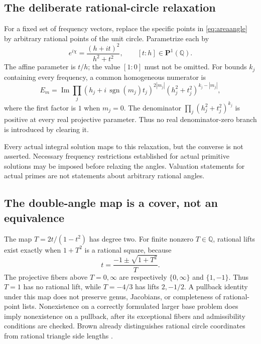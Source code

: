 \documentclass[11pt]{article}
\theoremstyle{definition}\newtheorem{definition}[theorem]{Definition}
\theoremstyle{remark}\newtheorem{remark}[theorem]{Remark}
\newcommand{\Q}{\mathbb Q}\newcommand{\Z}{\mathbb Z}\newcommand{\R}{\mathbb R}
\newcommand{\Pone}{\mathbf P^1}
\newcommand{\im}{\operatorname{Im}}\newcommand{\Jac}{\operatorname{Jac}}
\begin{document}
\subsection{The deliberate rational-circle relaxation}
For a fixed set of frequency vectors, replace the specific points in \eqref{eq:areaangle} by arbitrary rational points of the unit circle. Parametrize each by
\[
e^{i\chi}=\frac{(h+it)^2}{h^2+t^2},\qquad [t:h]\in\Pone(\Q).
\]
The affine parameter is $t/h$; the value $[1:0]$ must not be omitted. For bounds $k_j$ containing every frequency, a common homogeneous numerator is
\begin{equation}\label{eq:homogeneous}
E_m=\im\prod_j
(h_j+i\,\operatorname{sgn}(m_j)t_j)^{2|m_j|}
(h_j^2+t_j^2)^{k_j-|m_j|},
\end{equation}
where the first factor is $1$ when $m_j=0$. The denominator
$\prod_j(h_j^2+t_j^2)^{k_j}$ is positive at every real projective parameter. Thus no real denominator-zero branch is introduced by clearing it.

Every actual integral solution maps to this relaxation, but the converse is not asserted. Necessary frequency restrictions established for actual primitive solutions may be imposed before relaxing the angles. Valuation statements for actual primes are not statements about arbitrary rational angles.

\subsection{The double-angle map is a cover, not an equivalence}
The map $T=2t/(1-t^2)$ has degree two. For finite nonzero $T\in\Q$, rational lifts exist exactly when $1+T^2$ is a rational square, because
\[
t=\frac{-1\pm\sqrt{1+T^2}}{T}.
\]
The projective fibers above $T=0,\infty$ are respectively $\{0,\infty\}$ and $\{1,-1\}$. Thus $T=1$ has no rational lift, while $T=-4/3$ has lifts $2,-1/2$. A pullback identity under this map does not preserve genus, Jacobians, or completeness of rational-point lists. Nonexistence on a correctly formulated larger base problem does imply nonexistence on a pullback, after its exceptional fibers and admissibility conditions are checked. Brown already distinguishes rational circle coordinates from rational triangle side lengths \cite{Brown511}.
\end{document}
